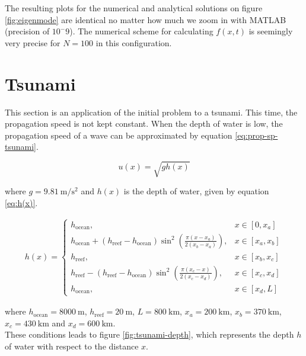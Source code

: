 \documentclass[a4paper,12pt,twoside]{article}
\newcommand{\bracket}[1]{\left(#1\right)}
\newcommand{\sqbracket}[1]{\left[#1\right]}
\begin{document}
    The resulting plots for the numerical and analytical solutions on figure \ref{fig:eigenmode} are identical no matter how much we zoom in with MATLAB (precision of $10^-9$). The numerical scheme for calculating $f(x,t)$ is seemingly very precise for $N=100$ in this configuration.

    \section{Tsunami}
      This section is an application of the initial problem to a tsunami.
      This time, the propagation speed is not kept constant.
      When the depth of water is low, the propagation speed of a wave can be approximated by equation \eqref{eq:prop-sp-tsunami}.

      \begin{equation}
        u\bracket{x} = \sqrt{gh\bracket{x}}
        \label{eq:prop-sp-tsunami}
      \end{equation}

      where $g=\SI{9.81}{\meter\per\square\second}$ and $h\bracket{x}$ is the depth of water, given by equation \eqref{eq:h(x)}.

      \begin{align}
        h(x)=
        \begin{cases}
          h_\text{ocean}, &x\in\sqbracket{0,x_a} \\
          h_\text{ocean} + \bracket{h_\text{reef} - h_\text{ocean}}\sin^2\bracket{\frac{\pi\bracket{x-x_a}}{2\bracket{x_b-x_a}}}, &x\in\sqbracket{x_a,x_b} \\
          h_\text{reef}, &x\in\sqbracket{x_b,x_c} \\
          h_\text{reef} - \bracket{h_\text{reef} - h_\text{ocean}}\sin^2\bracket{\frac{\pi\bracket{x_c - x}}{2\bracket{x_c-x_d}}}, &x\in\sqbracket{x_c,x_d} \\
          h_\text{ocean}, &x\in\sqbracket{x_d, L}
        \end{cases}
        \label{eq:h(x)}
      \end{align}

      where $h_\text{ocean} = \SI{8000}{\m}$, $h_\text{reef} = \SI{20}{\meter}$, $L=\SI{800}{\kilo\meter}$, $x_a = \SI{200}{\kilo\meter}$, $x_b = \SI{370}{\kilo\meter}$, $x_c=\SI{430}{\kilo\meter}$ and $x_d=\SI{600}{\kilo\meter}$.\\

      These conditions leads to figure \ref{fig:tsunami-depth}, which represents the depth $h$ of water with respect to the distance $x$.
\end{document}
